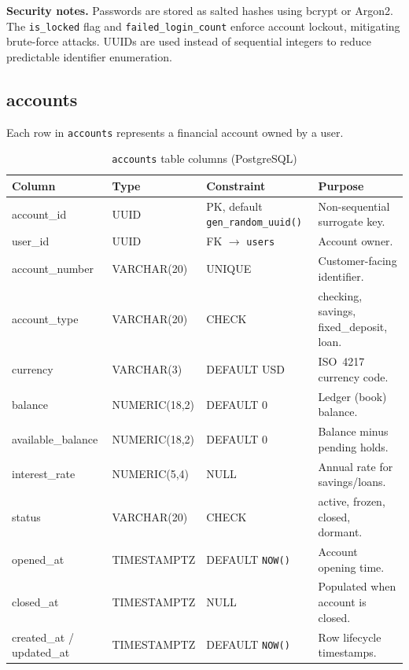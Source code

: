 \noindent\textbf{Security notes.}
Passwords are stored as salted hashes using bcrypt or Argon2. The \texttt{is\_locked} flag and \texttt{failed\_login\_count} enforce account lockout, mitigating brute-force attacks. UUIDs are used instead of sequential integers to reduce predictable identifier enumeration.

\subsection{accounts}
\label{sec:tbl-accounts}

Each row in \texttt{accounts} represents a financial account owned by a user.

\begin{table}[htbp]
  \centering
  \caption{\texttt{accounts} table columns (PostgreSQL)}
  \label{tab:accounts}
  \small
  \setlength{\tabcolsep}{4pt}
  \renewcommand{\arraystretch}{1.15}
  \begin{tabularx}{\textwidth}{@{} l l l X @{}}
    \toprule
    \textbf{Column} & \textbf{Type} & \textbf{Constraint} & \textbf{Purpose} \\
    \midrule
    account\_id       & UUID & PK, default \texttt{gen\_random\_uuid()} & Non-sequential surrogate key. \\
    user\_id          & UUID & FK $\to$ \texttt{users} & Account owner. \\
    account\_number   & VARCHAR(20)     & UNIQUE        & Customer-facing identifier. \\
    account\_type     & VARCHAR(20)     & CHECK         & checking, savings, fixed\_deposit, loan. \\
    currency          & VARCHAR(3)      & DEFAULT USD   & ISO~4217 currency code. \\
    balance           & NUMERIC(18,2)   & DEFAULT 0     & Ledger (book) balance. \\
    available\_balance& NUMERIC(18,2)   & DEFAULT 0     & Balance minus pending holds. \\
    interest\_rate    & NUMERIC(5,4)    & NULL          & Annual rate for savings/loans. \\
    status            & VARCHAR(20)     & CHECK         & active, frozen, closed, dormant. \\
    opened\_at        & TIMESTAMPTZ     & DEFAULT \texttt{NOW()} & Account opening time. \\
    closed\_at        & TIMESTAMPTZ     & NULL          & Populated when account is closed. \\
    created\_at / updated\_at & TIMESTAMPTZ & DEFAULT \texttt{NOW()} & Row lifecycle timestamps. \\
    \bottomrule
  \end{tabularx}
\end{table}

